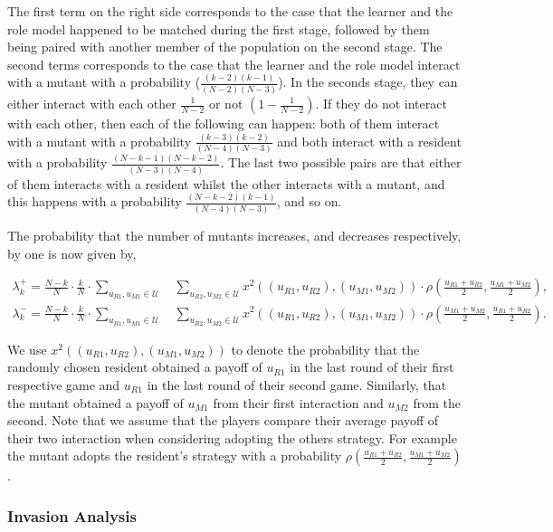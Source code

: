 \documentclass[11pt]{article}
\theoremstyle{plainCl1}
\theoremstyle{plainCl2}
\begin{document}
The first term on the right side corresponds to the case that the learner and
the role model happened to be matched during the first stage,
followed by them being paired with another member of the population on the
second stage. The second terms corresponds to the case that the learner and the
role model interact with a mutant with a probability ($\frac{\left(k - 2\right)
\left(k - 1\right)}{(N\!-\!2)(N\!-\!3)}$). In the seconds stage, they can either
interact with each other $\frac{1}{N - 2}$ or not $(1 - \frac{1}{N - 2})$. If
they do not interact with each other, then each of the following can happen:
both of them interact with a mutant with a probability
$\frac{(k-3)(k-2)}{(N-4)(N-3)}$ and both interact with a resident with a
probability $\frac{(N-k-1)(N-k-2)}{(N-3)(N-4)}$. The last two possible pairs
are that either of them interacts with a resident whilst the other interacts
with a mutant, and this happens with a probability
$\frac{(N-k-2)(k-1)}{(N-4)(N-3)}$, and so on.

The probability that the number of mutants increases, and decreases
respectively, by one is now given by,

\begin{align}\label{eq:ratio_limited}
\lambda^+_k=\frac{N\!-\!k}{N}\cdot \frac{k}{N}\cdot \sum_{u_{R1},u_{M1}\in\mathcal{U}} \quad \sum_{u_{R2},u_{M2}\in\mathcal{U}} x^{2}((u_{R1}, u_{R2}),(u_{M1}, u_{M2}))\cdot \rho\left(\frac{u_{R1} + u_{R2}}{2}, \frac{u_{M1} + u_{M2}}{2}\right), \\
\lambda^-_k=\frac{N\!-\!k}{N}\cdot \frac{k}{N}\cdot \sum_{u_{R1},u_{M1}\in\mathcal{U}} \quad \sum_{u_{R2},u_{M2}\in\mathcal{U}} x^{2}((u_{R1}, u_{R2}),(u_{M1}, u_{M2}))\cdot \rho\left(\frac{u_{M1} + u_{M2}}{2}, \frac{u_{R1} + u_{R2}}{2}\right).
\end{align}

We use $x^{2}((u_{R1}, u_{R2}),(u_{M1}, u_{M2}))$ to denote the probability that
the randomly chosen resident obtained a payoff of $u_{R1}$ in the last round of
their first respective game and $u_{R1}$ in the last round of their second game.
Similarly, that the mutant obtained a payoff of $u_{M1}$ from their first
interaction and $u_{M2}$ from the second. Note that we assume that the players
compare their average payoff of their two interaction when considering adopting
the others strategy. For example the mutant adopts the resident's strategy with
a probability $\rho\left(\frac{u_{R1} + u_{R2}}{2}, \frac{u_{M1} +
u_{M2}}{2}\right)$.

\subsubsection*{Invasion Analysis}
\end{document}
